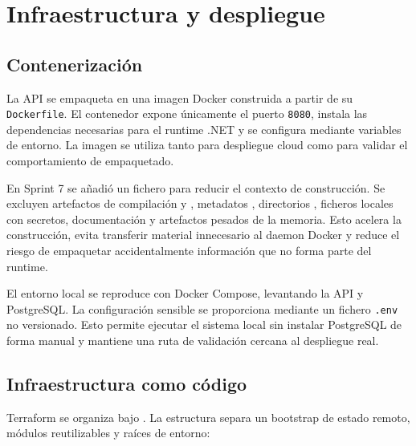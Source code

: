 \chapter{Infraestructura y despliegue}
\label{chap:infraestructura-despliegue}

\section{Contenerización}
\label{sec:contenerizacion}

La API se empaqueta en una imagen Docker construida a partir de su \texttt{Dockerfile}. El contenedor expone únicamente el puerto \texttt{8080}, instala las dependencias necesarias para el runtime .NET y se configura mediante variables de entorno. La imagen se utiliza tanto para despliegue cloud como para validar el comportamiento de empaquetado.

En Sprint 7 se añadió un fichero  para reducir el contexto de construcción. Se excluyen artefactos de compilación  y , metadatos , directorios , ficheros locales con secretos, documentación y artefactos pesados de la memoria. Esto acelera la construcción, evita transferir material innecesario al daemon Docker y reduce el riesgo de empaquetar accidentalmente información que no forma parte del runtime.

El entorno local se reproduce con Docker Compose, levantando la API y PostgreSQL. La configuración sensible se proporciona mediante un fichero \texttt{.env} no versionado. Esto permite ejecutar el sistema local sin instalar PostgreSQL de forma manual y mantiene una ruta de validación cercana al despliegue real.

\section{Infraestructura como código}
\label{sec:infraestructura-codigo}

Terraform se organiza bajo . La estructura separa un bootstrap de estado remoto, módulos reutilizables y raíces de entorno:

